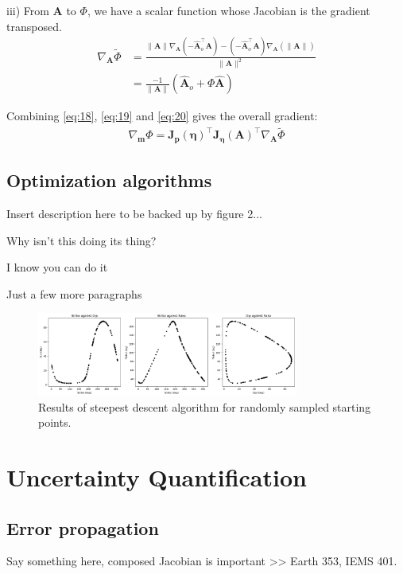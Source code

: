 \documentclass[preprint]{seismica}
\begin{document}
    iii) From $\bm{A}$ to $\Phi$, we have a scalar function whose Jacobian is the gradient
    transposed.
    \begin{align} \label{eq:20}
      \nonumber\nabla_{\bm{A}}\tilde{\Phi} &= \frac{\|\bm{A}\|\nabla_{\bm{A}}(-\hat{\bm{A}}_o^\top\bm{A}) - 
      (-\hat{\bm{A}}_o^\top \bm{A}) \nabla_{\bm{A}}(\|\bm{A}\|)}{\|\bm{A}\|^2}\\
            &= \frac{-1}{\|\bm{A}\|}(\hat{\bm{A}}_o + \Phi\hat{\bm{A}})
    \end{align}

    Combining \ref{eq:18}, \ref{eq:19} and \ref{eq:20} gives the overall gradient:
    \begin{align} \label{eq:21}
      \nabla_{\bm{m}}\Phi = \bm{J_p}(\bm{\eta})^\top \bm{J_\eta}(\bm{A})^\top \nabla_{\bm{A}}\tilde{\Phi}
    \end{align}

  \subsection{Optimization algorithms}

  Insert description here to be backed up by figure 2...

  Why isn't this doing its thing?

  I know you can do it

  Just a few more paragraphs

    \begin{figure}[ht!]
      \includegraphics[width=8.6cm]{seed_2024} 
      \caption{Results of steepest descent algorithm for randomly sampled starting points.}
      \label{fig:2}
    \end{figure}


\section{Uncertainty Quantification} \label{sec:uncertainty}

    \subsection{Error propagation}
      Say something here, composed Jacobian is important >> Earth 353, IEMS 401.
\end{document}

